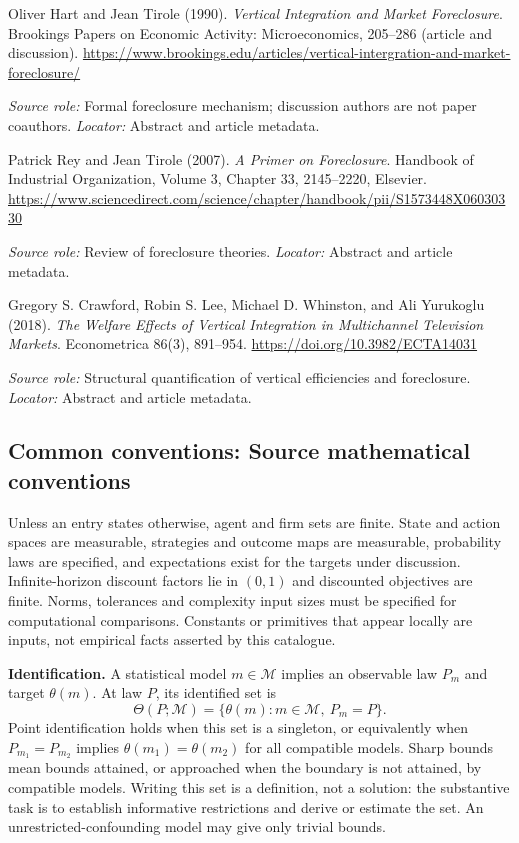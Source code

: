 \documentclass[11pt,a4paper]{article}
\begin{document}
\begin{enumerate}[label={[S\arabic*]},leftmargin=*]

\item Oliver Hart and Jean Tirole (1990). \emph{Vertical Integration and Market Foreclosure}. Brookings Papers on Economic Activity: Microeconomics, 205--286 (article and discussion). \url{https://www.brookings.edu/articles/vertical-intergration-and-market-foreclosure/}\par \textit{Source role:} Formal foreclosure mechanism; discussion authors are not paper coauthors. \textit{Locator:} Abstract and article metadata.

\item Patrick Rey and Jean Tirole (2007). \emph{A Primer on Foreclosure}. Handbook of Industrial Organization, Volume 3, Chapter 33, 2145--2220, Elsevier. \url{https://www.sciencedirect.com/science/chapter/handbook/pii/S1573448X06030330}\par \textit{Source role:} Review of foreclosure theories. \textit{Locator:} Abstract and article metadata.

\item Gregory S. Crawford, Robin S. Lee, Michael D. Whinston, and Ali Yurukoglu (2018). \emph{The Welfare Effects of Vertical Integration in Multichannel Television Markets}. Econometrica 86(3), 891--954. \url{https://doi.org/10.3982/ECTA14031}\par \textit{Source role:} Structural quantification of vertical efficiencies and foreclosure. \textit{Locator:} Abstract and article metadata.

\end{enumerate}

\subsection*{Common conventions: Source mathematical conventions}

Unless an entry states otherwise, agent and firm sets are finite. State and action spaces are measurable, strategies and outcome maps are measurable, probability laws are specified, and expectations exist for the targets under discussion. Infinite-horizon discount factors lie in $(0,1)$ and discounted objectives are finite. Norms, tolerances and complexity input sizes must be specified for computational comparisons. Constants or primitives that appear locally are inputs, not empirical facts asserted by this catalogue.

\textbf{Identification.} A statistical model $m\in\mathcal M$ implies an observable law $P_m$ and target $\theta(m)$. At law $P$, its identified set is
\[
\Theta(P;\mathcal M)=\{\theta(m):m\in\mathcal M,\ P_m=P\}.
\]
Point identification holds when this set is a singleton, or equivalently when $P_{m_1}=P_{m_2}$ implies $\theta(m_1)=\theta(m_2)$ for all compatible models. Sharp bounds mean bounds attained, or approached when the boundary is not attained, by compatible models. Writing this set is a definition, not a solution: the substantive task is to establish informative restrictions and derive or estimate the set. An unrestricted-confounding model may give only trivial bounds.
\end{document}
